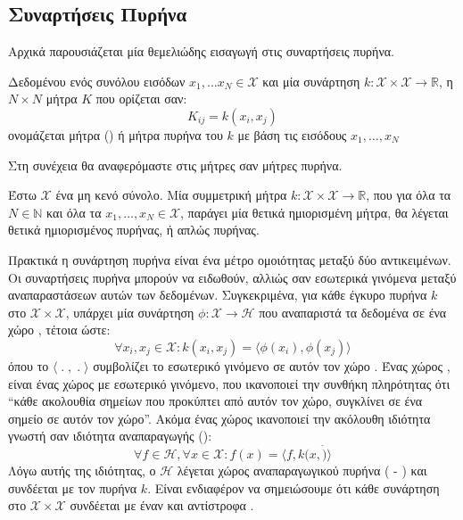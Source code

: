 \subsection{Συναρτήσεις Πυρήνα}
Αρχικά παρουσιάζεται μία θεμελιώδης εισαγωγή στις συναρτήσεις πυρήνα.
\begin{definition}
Δεδομένου ενός συνόλου εισόδων $x_{1}, \dots x_{N} \in \mathcal{X}$ και μία συνάρτηση $k:\mathcal{X}\times\mathcal{X}\rightarrow \mathbb{R}$, η $N \times N$ μήτρα $K$ που ορίζεται σαν:
$$K_{ij} = k(x_{i}, x_{j}) $$
ονομάζεται  μήτρα () ή μήτρα πυρήνα του $k$ με βάση τις εισόδους $x_{1}, \dots, x_{N}$
\label{def:kernel_matrix}
\end{definition}
Στη συνέχεια θα αναφερόμαστε στις μήτρες  σαν μήτρες πυρήνα.
\begin{definition}
Έστω $\mathcal{X}$ ένα μη κενό σύνολο.
Μία συμμετρική μήτρα $k:\mathcal{X} \times \mathcal{X} \rightarrow \mathbb{R}$, που για όλα τα $N \in \mathbb{N}$ και όλα τα $x_{1},\dots, x_{N} \in \mathcal{X}$, παράγει μία θετικά ημιορισμένη μήτρα, θα λέγεται θετικά ημιορισμένος πυρήνας, ή απλώς πυρήνας.
\label{def:psd_km}
\end{definition}
Πρακτικά η συνάρτηση πυρήνα είναι ένα μέτρο ομοιότητας μεταξύ δύο αντικειμένων.
Οι συναρτήσεις πυρήνα μπορούν να ειδωθούν, αλλιώς σαν εσωτερικά γινόμενα μεταξύ αναπαραστάσεων αυτών των δεδομένων.
Συγκεκριμένα, για κάθε έγκυρο πυρήνα $k$ στο $\mathcal{X}\times\mathcal{X}$, υπάρχει μία συνάρτηση $\phi: \mathcal{X} \rightarrow \mathcal{H}$ που αναπαριστά τα δεδομένα σε ένα χώρο , τέτοια ώστε:
\begin{equation}
\forall x_{i}, x_{j} \in \mathcal{X}: k(x_{i}, x_{j}) = \langle \phi(x_{i}), \phi(x_{j}) \rangle
\end{equation}
όπου το $\langle\;.\;,\;.\;\rangle$ συμβολίζει το εσωτερικό γινόμενο σε αυτόν τον χώρο .
Ένας χώρος , είναι ένας χώρος με εσωτερικό γινόμενο, που ικανοποιεί την συνθήκη πληρότητας ότι ``κάθε ακολουθία σημείων  που προκύπτει από αυτόν τον χώρο, συγκλίνει σε ένα σημείο σε αυτόν τον χώρο''. Ακόμα ένας χώρος  ικανοποιεί την ακόλουθη ιδιότητα γνωστή σαν ιδιότητα αναπαραγωγής ():
\begin{equation}
\forall f \in \mathcal{H}, \forall x \in \mathcal{X}: f(x)=\langle f, k(x,\dot)\rangle
\end{equation}
Λόγω αυτής της ιδιότητας, ο $\mathcal{H}$ λέγεται χώρος  αναπαραγωγικού πυρήνα ( - ) και συνδέεται με τον πυρήνα $k$.
Είναι ενδιαφέρον να σημειώσουμε ότι κάθε συνάρτηση στο $\mathcal{X} \times \mathcal{X}$ συνδέεται με έναν  και αντίστροφα \cite{Aronszajn1950}.
